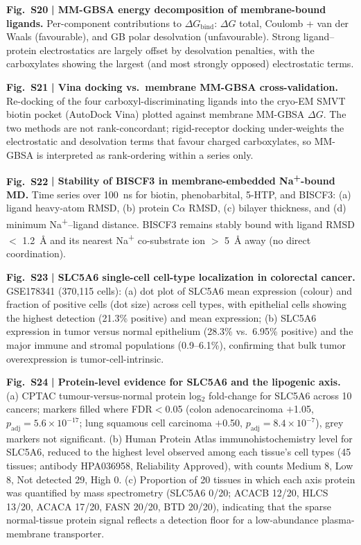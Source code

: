 \documentclass[pdflatex,sn-nature]{sn-jnl}
\begin{document}
\noindent\textbf{Fig.~S20} \textbf{| MM-GBSA energy decomposition of membrane-bound ligands.} Per-component contributions to $\Delta G_{\mathrm{bind}}$: $\Delta G$ total, Coulomb + van der Waals (favourable), and GB polar desolvation (unfavourable). Strong ligand--protein electrostatics are largely offset by desolvation penalties, with the carboxylates showing the largest (and most strongly opposed) electrostatic terms.

\noindent\textbf{Fig.~S21} \textbf{| Vina docking vs.\ membrane MM-GBSA cross-validation.} Re-docking of the four carboxyl-discriminating ligands into the cryo-EM SMVT biotin pocket (AutoDock Vina) plotted against membrane MM-GBSA $\Delta G$. The two methods are not rank-concordant; rigid-receptor docking under-weights the electrostatic and desolvation terms that favour charged carboxylates, so MM-GBSA is interpreted as rank-ordering within a series only.

\noindent\textbf{Fig.~S22} \textbf{| Stability of BISCF3 in membrane-embedded Na\textsuperscript{+}-bound MD.} Time series over 100~ns for biotin, phenobarbital, 5-HTP, and BISCF3: (a) ligand heavy-atom RMSD, (b) protein C$\alpha$ RMSD, (c) bilayer thickness, and (d) minimum Na\textsuperscript{+}--ligand distance. BISCF3 remains stably bound with ligand RMSD $<$ 1.2~\AA{} and its nearest Na\textsuperscript{+} co-substrate ion $>$ 5~\AA{} away (no direct coordination).

\noindent\textbf{Fig.~S23} \textbf{| SLC5A6 single-cell cell-type localization in colorectal cancer.} GSE178341 (370,115 cells): (a) dot plot of SLC5A6 mean expression (colour) and fraction of positive cells (dot size) across cell types, with epithelial cells showing the highest detection (21.3\% positive) and mean expression; (b) SLC5A6 expression in tumor versus normal epithelium (28.3\% vs.\ 6.95\% positive) and the major immune and stromal populations (0.9--6.1\%), confirming that bulk tumor overexpression is tumor-cell-intrinsic.

\noindent\textbf{Fig.~S24} \textbf{| Protein-level evidence for SLC5A6 and the lipogenic axis.} (a) CPTAC tumour-versus-normal protein log$_2$ fold-change for SLC5A6 across 10 cancers; markers filled where FDR$<$0.05 (colon adenocarcinoma $+$1.05, $p_{\mathrm{adj}} = 5.6\times10^{-17}$; lung squamous cell carcinoma $+$0.50, $p_{\mathrm{adj}} = 8.4\times10^{-7}$), grey markers not significant. (b) Human Protein Atlas immunohistochemistry level for SLC5A6, reduced to the highest level observed among each tissue's cell types (45 tissues; antibody HPA036958, Reliability Approved), with counts Medium 8, Low 8, Not detected 29, High 0. (c) Proportion of 20 tissues in which each axis protein was quantified by mass spectrometry (SLC5A6 0/20; ACACB 12/20, HLCS 13/20, ACACA 17/20, FASN 20/20, BTD 20/20), indicating that the sparse normal-tissue protein signal reflects a detection floor for a low-abundance plasma-membrane transporter.
\end{document}
